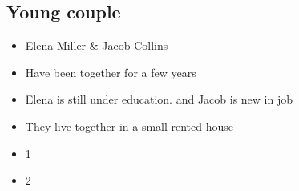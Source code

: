 \subsection{Young couple}

\begin{itemize}
\item Elena Miller \& Jacob Collins
\item Have been together for a few years
\item Elena is still under education. and Jacob is new in job
\item They live together in a small rented house
\end{itemize}
\begin{minipage}{2}
\begin{itemize}
\item 1
\end{itemize}
\begin{itemize}
\item 2
\end{itemize}
\end{minipage}